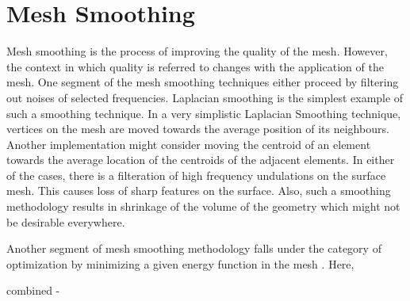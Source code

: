 \section{Mesh Smoothing}

Mesh smoothing is the process of improving the quality of the mesh. However, the context in which quality is referred to changes with the application of the mesh. One segment of the mesh smoothing techniques either proceed by filtering out noises of selected frequencies. Laplacian smoothing is the simplest example of such a smoothing technique. In a very simplistic Laplacian Smoothing technique, vertices on the mesh are moved towards the average position of its neighbours. Another implementation might consider moving the centroid of an element towards the average location of the centroids of the adjacent elements. In either of the cases, there is a filteration of high frequency undulations on the surface mesh. This causes loss of sharp features on the surface. Also, such a smoothing methodology results in shrinkage of the volume of the geometry which might not be desirable everywhere.

Another segment of mesh smoothing methodology falls under the category of optimization by minimizing a given energy function in the mesh \cite{freitag1997tetrahedral, zhou2000angle, chen2004mesh}. Here, 

combined - \cite{freitag1997combining, canann1998approach}
